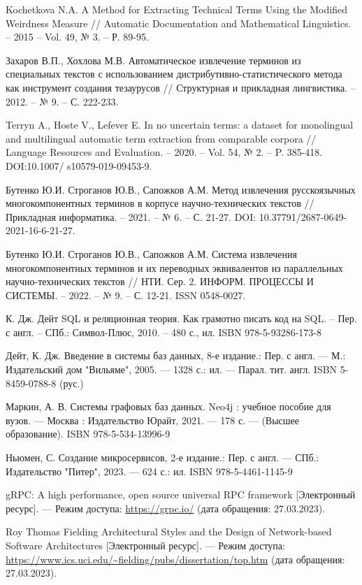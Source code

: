 \begin{thebibliography}{}
	Kochetkova N.A. A Method for Extracting Technical Terms Using the Modified Weirdness Measure // Automatic Documentation and Mathematical Linguistics. – 2015 – Vol. 49, № 3. – Р. 89-95.
	
	Захаров В.П., Хохлова М.В. Автоматическое извлечение терминов из специальных текстов с использованием дистрибутивно-статистического метода как инструмент создания тезаурусов // Структурная и прикладная лингвистика. – 2012. – № 9. – С. 222-233.
	
	Terryn A., Hoste V., Lefever E. In no uncertain terms: a dataset for monolingual and multilingual automatic term extraction from comparable corpora // Language Resources and Evaluation. – 2020. – Vol. 54, № 2. – P. 385-418. DOI:10.1007/ s10579-019-09453-9.
	
	Бутенко Ю.И. Строганов Ю.В., Сапожков А.М. Метод извлечения русскоязычных многокомпонентных терминов в корпусе научно-технических текстов // Прикладная информатика. – 2021. – № 6. – С. 21-27. DOI: 10.37791/2687-0649-2021-16-6-21-27.
	
	Бутенко Ю.И. Строганов Ю.В., Сапожков А.М. Система извлечения многокомпонентных терминов и их переводных эквивалентов из параллельных научно-технических текстов // НТИ. Сер. 2. ИНФОРМ. ПРОЦЕССЫ И СИСТЕМЫ. – 2022. – № 9. – С. 12-21. ISSN 0548-0027.
	
	 К. Дж. Дейт
	SQL и реляционная теория. Как грамотно писать код на SQL. – Пер. с англ. – СПб.: Символ-Плюс, 2010. – 480 с., ил. ISBN 978-5-93286-173-8
	
	Дейт, К. Дж. Введение в системы баз данных, 8-е издание.: Пер. с англ. — М.: Издательский дом "Вильяме", 2005. — 1328 с.: ил. — Парал. тит. англ. ISBN 5-8459-0788-8 (рус.)
	
	Маркин, А. В. Системы графовых баз данных. Neo4j : учебное пособие для вузов. — Москва : Издательство Юрайт, 2021. — 178 с. — (Высшее образование). ISBN 978-5-534-13996-9
	
	Ньюмен, С. Создание микросервисов, 2-е издание.: Пер. с англ. — СПб.: Издательство "Питер", 2023. — 624 с.: ил. ISBN 978-5-4461-1145-9
	
	gRPC: A high performance, open source universal RPC framework [Электронный ресурс]. — Режим доступа: \url{https://grpc.io/} (дата обращения: 27.03.2023).
	
	Roy Thomas Fielding Architectural Styles and the Design of Network-based Software Architectures [Электронный ресурс]. — Режим доступа: \url{https://www.ics.uci.edu/~fielding/pubs/dissertation/top.htm} (дата обращения: 27.03.2023).
	

\end{thebibliography}
